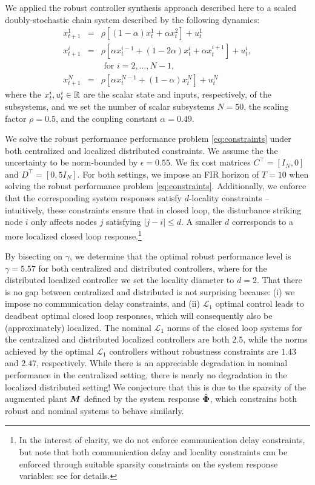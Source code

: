 We applied the robust controller synthesis approach described here to a scaled doubly-stochastic chain system described by the following dynamics:
\begin{equation}\label{eq:chain}
\begin{array}{rcl}
x^1_{t+1} &=& \rho\left[(1-\alpha)x^1_t + \alpha x^2_t\right] + u^1_t\\
x^i_{t+1} &=& \rho\left[\alpha x^{i-1}_t + (1-2\alpha)x^i_t + \alpha x^{i+1}_t\right] + u^i_t,\\
&& \text{ for $i=2,\dots,N-1$,} \\
 x^N_{t+1} &=& \rho\left[\alpha x^{N-1}_t + (1-\alpha)x^N_t\right] + u^N_t
 \end{array}
\end{equation}
where the $x^i_t, u^i_t \in \mathbb{R}$ are the scalar state and inputs, respectively, of the subsystems, and we set the number of scalar subsystems $N=50$, the scaling factor $\rho = 0.5$, and the coupling constant $\alpha = 0.49$.  

We solve the robust performance performance problem \eqref{eq:constraints} under both centralized and localized distributed constraints. We assume the the uncertainty to be norm-bounded by $\epsilon = 0.55$. We fix cost matrices $C^\top = [I_N, 0]$ and $D^\top = [0, 5I_N]$.  For both settings, we impose an FIR horizon of $T=10$ when solving the robust performance problem \eqref{eq:constraints}.  Additionally, we enforce that the corresponding system responses satisfy $d$-locality constraints -- intuitively, these constraints ensure that in closed loop, the disturbance striking node $i$ only affects nodes $j$ satisfying $|j-i|\leq d$. A smaller $d$ corresponds to a more localized closed loop response.\footnote{In the interest of clarity, we do not enforce communication delay constraints, but note that both communication delay and locality constraints can be enforced through suitable sparsity constraints on the system response variables: see \cite{anderson2019system} for details.}

By bisecting on $\gamma$, we determine that the optimal robust performance level is $\gamma = 5.57$ for both centralized and distributed controllers, where for the distributed localized controller we set the locality diameter to $d=2$.  That there is no gap between centralized and distributed is not surprising because: (i) we impose no communication delay constraints, and (ii) $\mathcal{L}_1$ optimal control leads to deadbeat optimal closed loop responses, which will consequently also be (approximately) localized.  The nominal $\mathcal{L}_1$ norms of the closed loop systems for the centralized and distributed localized controllers are both $2.5$, while the norms achieved by the optimal $\mathcal{L}_1$ controllers without robustness constraints are $1.43$ and $2.47$, respectively.  While there is an appreciable degradation in nominal performance in the centralized setting, there is nearly no degradation in the localized distributed setting!  We conjecture that this is due to the sparsity of the augmented plant $\boldsymbol{M}$ defined by the system response $\hat{\boldsymbol{\Phi}}$, which constrains both robust and nominal systems to behave similarly.

